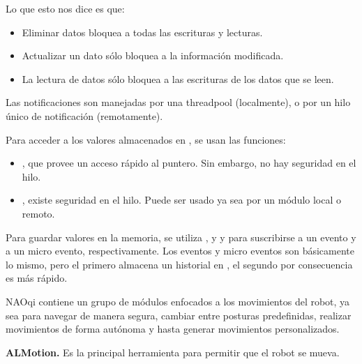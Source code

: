 Lo que esto nos dice es que:
\begin{itemize}
\item {} 
Eliminar datos bloquea a todas las escrituras y lecturas.

\item {} 
Actualizar un dato sólo bloquea a la información modificada.

\item {} 
La lectura de datos sólo bloquea a las escrituras de los datos que se leen.

\end{itemize}

Las notificaciones son manejadas por una threadpool (localmente), o por un
hilo único de notificación (remotamente).


Para acceder a los valores almacenados en , se usan las funciones:
\begin{itemize}
\item {} 
, que provee un acceso rápido al puntero. Sin embargo, no hay seguridad en el hilo.

\item {} 
, existe seguridad en el hilo. Puede ser usado ya sea por un módulo local o remoto.

\end{itemize}

Para guardar valores en la memoria, se utiliza , y
 y 
para suscribirse a un evento y a un micro evento, respectivamente. Los eventos
y micro eventos son básicamente lo mismo, pero el primero almacena un historial
en , el segundo por consecuencia es más rápido.

NAOqi contiene un grupo de módulos enfocados a los movimientos del robot,
ya sea para navegar de manera segura, cambiar entre posturas predefinidas,
realizar movimientos de forma autónoma y hasta generar movimientos
personalizados.


\textbf{ALMotion.}
\label{\detokenize{chapter_one/naoqi:almotion}}
Es la principal herramienta para permitir que el robot se mueva.

